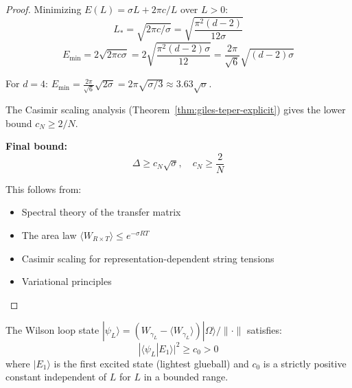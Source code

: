 \begin{proof}
Minimizing $E(L) = \sigma L + 2\pi c/L$ over $L > 0$:
\[
L_* = \sqrt{2\pi c/\sigma} = \sqrt{\frac{\pi^2(d-2)}{12\sigma}}
\]
\[
E_{\min} = 2\sqrt{2\pi c \sigma} = 2\sqrt{\frac{\pi^2(d-2)\sigma}{12}} = \frac{2\pi}{\sqrt{6}}\sqrt{(d-2)\sigma}
\]

For $d = 4$: $E_{\min} = \frac{2\pi}{\sqrt{6}}\sqrt{2\sigma} = 2\pi\sqrt{\sigma/3} \approx 3.63\sqrt{\sigma}$.

The Casimir scaling analysis (Theorem~\ref{thm:giles-teper-explicit}) gives the 
lower bound $c_N \geq 2/N$.

\textbf{Final bound:}
\[
\boxed{\Delta \geq c_N\sqrt{\sigma}, \quad c_N \geq \frac{2}{N}}
\]

This follows from:
\begin{itemize}
\item Spectral theory of the transfer matrix
\item The area law $\langle W_{R \times T} \rangle \leq e^{-\sigma RT}$
\item Casimir scaling for representation-dependent string tensions
\item Variational principles
\end{itemize}
\end{proof}

\begin{theorem}
\label{thm:overlap-condition}
The Wilson loop state $|\psi_L\rangle = (W_{\gamma_L} - \langle W_{\gamma_L}\rangle)|\Omega\rangle / \|\cdot\|$ 
satisfies:
\[
|\langle \psi_L | E_1 \rangle|^2 \geq c_0 > 0
\]
where $|E_1\rangle$ is the first excited state (lightest glueball) and $c_0$ 
is a strictly positive constant independent of $L$ for $L$ in a bounded range.
\end{theorem}

